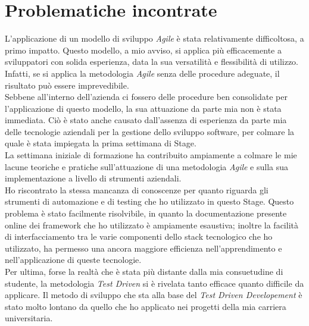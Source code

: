 \section{Problematiche incontrate}
L'applicazione di un modello di sviluppo \emph{Agile} è stata relativamente difficoltosa, a primo impatto. Questo modello, a mio avviso, si applica più efficacemente a sviluppatori con solida esperienza, data la sua versatilità e flessibilità di utilizzo. Infatti, se si applica la metodologia \emph{Agile} senza delle procedure adeguate, il risultato può essere imprevedibile.\\
Sebbene all'interno dell'azienda ci fossero delle procedure ben consolidate per l'applicazione di questo modello, la sua attuazione da parte mia non è stata immediata. Ciò è stato anche causato dall'assenza di esperienza da parte mia delle tecnologie aziendali per la gestione dello sviluppo software, per colmare la quale è stata impiegata la prima settimana di Stage.\\
La settimana iniziale di formazione ha contribuito ampiamente a colmare le mie lacune teoriche e pratiche sull'attuazione di una metodologia \emph{Agile} e sulla sua implementazione a livello di strumenti aziendali.\\
Ho riscontrato la stessa mancanza di conoscenze per quanto riguarda gli strumenti di automazione e di testing che ho utilizzato in questo Stage. Questo problema è stato facilmente risolvibile, in quanto la documentazione presente online dei framework che ho utilizzato è ampiamente esaustiva; inoltre la facilità di interfacciamento tra le varie componenti dello stack tecnologico che ho utilizzato, ha permesso una ancora maggiore efficienza nell'apprendimento e nell'applicazione di queste tecnologie.\\
Per ultima, forse la realtà che è stata più distante dalla mia consuetudine di studente, la metodologia \emph{Test Driven} si è rivelata tanto efficace quanto difficile da applicare. Il metodo di sviluppo che sta alla base del \emph{Test Driven Developement} è stato molto lontano da quello che ho applicato nei progetti della mia carriera universitaria.

